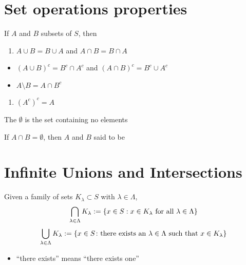 \documentclass[letterpaper,10pt,english]{jupyterBook}
\begin{document}
\section{Set operations properties}
\label{\detokenize{03.set_theory:set-operations-properties}}
\sphinxAtStartPar
If \(A\) and \(B\) subsets of \(S\), then
\begin{enumerate}
%
\item {} 
\sphinxAtStartPar
\(A \cup B = B \cup A\) and \(A \cap B = B \cap A\)

\end{enumerate}
\begin{itemize}
\item {} 
\sphinxAtStartPar
\((A \cup B)^c = B^c \cap A^c\) and \((A \cap B)^c = B^c \cup A^c\)

\item {} 
\sphinxAtStartPar
\(A \setminus B = A \cap B^c\)

\end{itemize}
\begin{enumerate}
%
\setcounter{enumi}{8}
\item {} 
\sphinxAtStartPar
\((A^c)^c = A\)

\end{enumerate}

\sphinxAtStartPar
The  \(\emptyset\) is the set containing no elements

\sphinxAtStartPar
If \(A \cap B = \emptyset\), then \(A\) and \(B\) said to be 


\section{Infinite Unions and Intersections}
\label{\detokenize{03.set_theory:infinite-unions-and-intersections}}
\sphinxAtStartPar
Given a family of sets \(K_{\lambda} \subset S\) with \(\lambda \in \Lambda\),
\begin{equation*}
\begin{split}
\bigcap_{\lambda \in \Lambda} K_{\lambda} 
:= \{ x \in S : x\in K_{\lambda}
\textnormal{ for all } \lambda \in \Lambda \}
\end{split}
\end{equation*}\begin{equation*}
\begin{split}
\bigcup_{\lambda \in \Lambda} K_{\lambda}  
:= \{x \in S \colon \textnormal{there
exists an } \lambda \in \Lambda \textnormal{ such that } x\in K_{\lambda} \}
\end{split}
\end{equation*}\begin{itemize}
\item {} 
\sphinxAtStartPar
“there exists” means “there exists  one”

\end{itemize}
\end{document}
